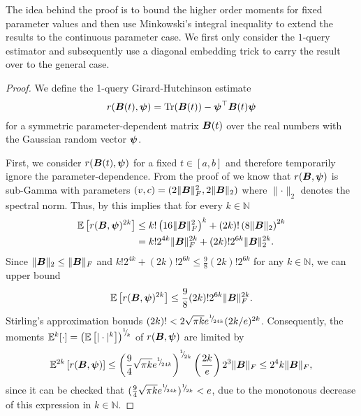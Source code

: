 \documentclass[12pt]{article}
\begin{document}
The idea behind the proof is to bound the higher order moments for fixed parameter values and then use Minkowski's integral inequality to extend the results to the continuous parameter case. We first only consider the $1$-query estimator and subsequently use a diagonal embedding trick to carry the result over to the general case.
\begin{proof} 
    We define the 1-query Girard-Hutchinson estimate 
    \begin{equation}
        r(\boldsymbol{B}(t), \boldsymbol{\psi}) = \operatorname{Tr}(\boldsymbol{B}(t)) - \boldsymbol{\psi}^{\top} \boldsymbol{B}(t) \boldsymbol{\psi}
    \end{equation}
    for a symmetric parameter-dependent matrix $\boldsymbol{B}(t)$ over the real numbers with the Gaussian random vector $\boldsymbol{\psi}$.

    First, we consider $r(\boldsymbol{B}(t), \boldsymbol{\psi})$ for a fixed $t \in [a,b]$ and therefore temporarily ignore the parameter-dependence. From the proof of \cite[lemma 3]{cortinovis-2022-randomized-trace} we know that $r(\boldsymbol{B}, \boldsymbol{\psi})$ is sub-Gamma with parameters $(v, c) = (2 \lVert \boldsymbol{B} \rVert _F^2, 2 \lVert \boldsymbol{B} \rVert _2)$ where $\lVert \cdot \rVert _2$ denotes the spectral norm. Thus, by \cite[theorem 2.3]{boucheron-2013-basic-inequalities} this implies that for every $k \in \mathbb{N}$
    \begin{align}
        \mathbb{E}\left[ r(\boldsymbol{B}, \boldsymbol{\psi})^{2 k} \right]
        &\leq k! \left( 16 \lVert \boldsymbol{B} \rVert _F^2 \right)^k + (2 k)! \left( 8 \lVert \boldsymbol{B} \rVert _2 \right)^{2 k} \notag \\
        &= k! 2^{4 k} \lVert \boldsymbol{B} \rVert _F^{2 k} + (2 k)! 2^{6 k} \lVert \boldsymbol{B} \rVert _2^{2 k}.
    \end{align}
    Since $\lVert \boldsymbol{B} \rVert _2 \leq \lVert \boldsymbol{B} \rVert _F$ and $k! 2^{4 k} + (2 k)! 2^{6 k} \leq \frac{9}{8}(2 k)! 2^{6 k}$ for any $k \in \mathbb{N}$, we can upper bound 
    \begin{equation}
        \mathbb{E}\left[ r(\boldsymbol{B}, \boldsymbol{\psi})^{2 k} \right] \leq \frac{9}{8} (2 k)! 2^{6 k} \lVert \boldsymbol{B} \rVert _F^{2k}.
    \end{equation}
    Stirling's approximation \cite{robbins-1955-remark-stirling} bonuds $(2 k)! < 2 \sqrt{\pi k}  e^{{}^{1}{\mskip -5mu/\mskip -3mu}_{24 k}} ( 2 k / e )^{2 k}$. Consequently, the moments $\mathbb{E}^{k}[\cdot] = \left(\mathbb{E}\left[ | \cdot |^{k} \right] \right)^{{}^{1}{\mskip -5mu/\mskip -3mu}_{k}}$ of $r(\boldsymbol{B}, \boldsymbol{\psi})$ are limited by
    \begin{equation}
        \mathbb{E}^{2k}\left[ r(\boldsymbol{B}, \boldsymbol{\psi}) \right]
        \leq \left( \frac{9}{4} \sqrt{\pi k} e^{{}^{1}{\mskip -5mu/\mskip -3mu}_{24 k}} \right)^{{}^{1}{\mskip -5mu/\mskip -3mu}_{2k}} \left( \frac{2 k}{e}\right) 2^{3} \lVert \boldsymbol{B} \rVert _F \leq 2^4 k \lVert \boldsymbol{B} \rVert _F,
        \label{equ:hutchinson-trace-onequery-fixed}
    \end{equation}
    since it can be checked that $(\frac{9}{4} \sqrt{\pi k} e^{{}^{1}{\mskip -5mu/\mskip -3mu}_{24 k}})^{{}^{1}{\mskip -5mu/\mskip -3mu}_{2k}} < e$, due to the monotonous decrease of this expression in $k \in \mathbb{N}$.


\end{proof}
\end{document}
